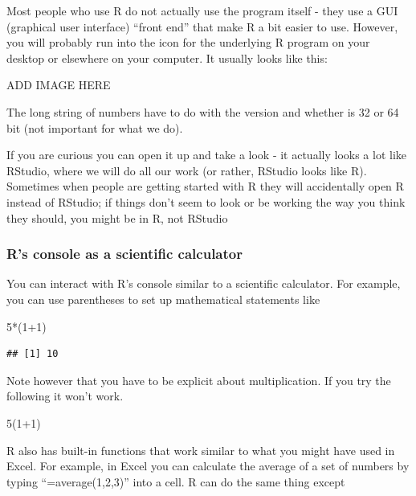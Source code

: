 \documentclass[
]{book}
\newenvironment{Shaded}{\begin{snugshade}}{\end{snugshade}}
\newcommand{\DecValTok}[1]{\textcolor[rgb]{0.00,0.00,0.81}{#1}}
\newcommand{\NormalTok}[1]{#1}
\newcommand{\SpecialCharTok}[1]{\textcolor[rgb]{0.00,0.00,0.00}{#1}}
\begin{document}
Most people who use R do not actually use the program itself - they use a GUI (graphical user interface) ``front end'' that make R a bit easier to use. However, you will probably run into the icon for the underlying R program on your desktop or elsewhere on your computer. It usually looks like this:

ADD IMAGE HERE

The long string of numbers have to do with the version and whether is 32 or 64 bit (not important for what we do).

If you are curious you can open it up and take a look - it actually looks a lot like RStudio, where we will do all our work (or rather, RStudio looks like R). Sometimes when people are getting started with R they will accidentally open R instead of RStudio; if things don't seem to look or be working the way you think they should, you might be in R, not RStudio

\hypertarget{rs-console-as-a-scientific-calculator}{%
\subsubsection{R's console as a scientific calculator}\label{rs-console-as-a-scientific-calculator}}

You can interact with R's console similar to a scientific calculator. For example, you can use parentheses to set up mathematical statements like

\begin{Shaded}
\begin{Highlighting}[]
\DecValTok{5}\SpecialCharTok{*}\NormalTok{(}\DecValTok{1}\SpecialCharTok{+}\DecValTok{1}\NormalTok{)}
\end{Highlighting}
\end{Shaded}

\begin{verbatim}
## [1] 10
\end{verbatim}

Note however that you have to be explicit about multiplication. If you try the following it won't work.

\begin{Shaded}
\begin{Highlighting}[]
\DecValTok{5}\NormalTok{(}\DecValTok{1}\SpecialCharTok{+}\DecValTok{1}\NormalTok{)}
\end{Highlighting}
\end{Shaded}

R also has built-in functions that work similar to what you might have used in Excel. For example, in Excel you can calculate the average of a set of numbers by typing ``=average(1,2,3)'' into a cell. R can do the same thing except
\end{document}
